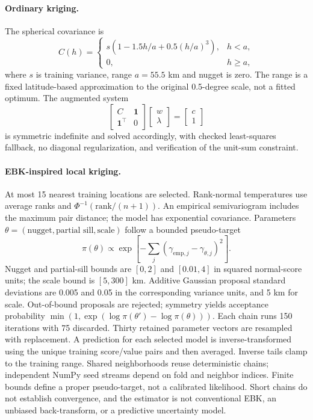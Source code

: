 \documentclass[11pt,a4paper]{article}
\begin{document}
\paragraph{Ordinary kriging.} The spherical covariance is
\begin{equation}
C(h)=\begin{cases}s(1-1.5h/a+0.5(h/a)^3),&h<a,\\0,&h\geq a,\end{cases}
\end{equation}
where $s$ is training variance, range $a=55.5$ km and nugget is zero. The range is a fixed latitude-based approximation to the original 0.5-degree scale, not a fitted optimum. The augmented system
\begin{equation}
\begin{bmatrix}C&\mathbf{1}\\\mathbf{1}^\top&0\end{bmatrix}\begin{bmatrix}w\\\lambda\end{bmatrix}=\begin{bmatrix}c\\1\end{bmatrix}
\end{equation}
is symmetric indefinite and solved accordingly, with checked least-squares fallback, no diagonal regularization, and verification of the unit-sum constraint.

\paragraph{EBK-inspired local kriging.} At most 15 nearest training locations are selected. Rank-normal temperatures use average ranks and $\Phi^{-1}(\mathrm{rank}/(n+1))$. An empirical semivariogram includes the maximum pair distance; the model has exponential covariance. Parameters $\theta=(\text{nugget},\text{partial sill},\text{scale})$ follow a bounded pseudo-target
\begin{equation}
\pi(\theta)\propto\exp\left[-\sum_j(\gamma_{\mathrm{emp},j}-\gamma_{\theta,j})^2\right].
\end{equation}
Nugget and partial-sill bounds are $[0,2]$ and $[0.01,4]$ in squared normal-score units; the scale bound is $[5,300]$ km. Additive Gaussian proposal standard deviations are 0.005 and 0.05 in the corresponding variance units, and 5 km for scale. Out-of-bound proposals are rejected; symmetry yields acceptance probability $\min(1,\exp(\log\pi(\theta')-\log\pi(\theta)))$. Each chain runs 150 iterations with 75 discarded. Thirty retained parameter vectors are resampled with replacement. A prediction for each selected model is inverse-transformed using the unique training score/value pairs and then averaged. Inverse tails clamp to the training range. Shared neighborhoods reuse deterministic chains; independent NumPy seed streams depend on fold and neighbor indices. Finite bounds define a proper pseudo-target, not a calibrated likelihood. Short chains do not establish convergence, and the estimator is not conventional EBK, an unbiased back-transform, or a predictive uncertainty model.
\end{document}

